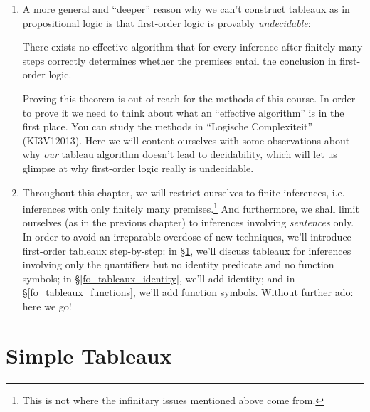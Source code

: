 \begin{enumerate}[\thesection.1]
		\item A more general and ``deeper'' reason why we can't construct tableaux as in propositional logic is that first-order logic is provably \emph{undecidable}:
		
		\begin{theorem} There exists no effective algorithm that for every inference after finitely many steps correctly determines whether the premises entail the conclusion in first-order logic.
		\end{theorem}
Proving this theorem is out of reach for the methods of this course. In order to prove it we need to think about what an ``effective algorithm'' is in the first place. You can study the methods in ``Logische Complexiteit'' (KI3V12013). Here we will content ourselves with some observations about why \emph{our} tableau algorithm doesn't lead to decidability, which will let us glimpse at why first-order logic really is undecidable.

	  \item Throughout this chapter, we will restrict ourselves to finite inferences, i.e. inferences with only finitely many premises.\footnote{%
		This is not where the infinitary issues mentioned above come from.}
		And furthermore, we shall limit ourselves (as in the previous chapter) to inferences involving \emph{sentences} only.
		In order to avoid an irreparable overdose of new techniques, we'll introduce first-order tableaux step-by-step:
		in \S\ref{fo_tableaux_simple},
		we'll discuss tableaux for inferences involving only the quantifiers but no identity predicate and no function symbols;
		in \S\ref{fo_tableaux_identity}, we'll add identity; and in \S\ref{fo_tableaux_functions}, we'll add function symbols.
		Without further ado: here we go!
				
	\end{enumerate}

\section{Simple Tableaux}
\label{fo_tableaux_simple}

